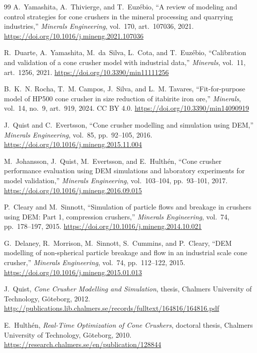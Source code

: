 \begin{thebibliography}{99}
 A.~Yamashita, A.~Thivierge, and T.~Euz\'ebio, ``A review of modeling and control strategies for cone crushers in the
mineral processing and quarrying industries,'' \emph{Minerals Engineering}, vol.~170, art.~107036, 2021.
\url{https://doi.org/10.1016/j.mineng.2021.107036}

 R.~Duarte, A.~Yamashita, M.~da~Silva, L.~Cota, and T.~Euz\'ebio, ``Calibration and validation of a cone crusher
model with industrial data,'' \emph{Minerals}, vol.~11, art.~1256, 2021. \url{https://doi.org/10.3390/min11111256}

 B.~K.~N. Rocha, T.~M. Campos, J.~Silva, and L.~M. Tavares, ``Fit-for-purpose model of HP500 cone crusher in size reduction of
itabirite iron ore,'' \emph{Minerals}, vol.~14, no.~9, art.~919, 2024. CC BY 4.0. \url{https://doi.org/10.3390/min14090919}

 J.~Quist and C.~Evertsson, ``Cone crusher modelling and simulation using DEM,'' \emph{Minerals Engineering}, vol.~85,
pp.~92--105, 2016. \url{https://doi.org/10.1016/j.mineng.2015.11.004}

 M.~Johansson, J.~Quist, M.~Evertsson, and E.~Hulth\'en, ``Cone crusher performance evaluation using DEM simulations and
laboratory experiments for model validation,'' \emph{Minerals Engineering}, vol.~103--104, pp.~93--101, 2017.
\url{https://doi.org/10.1016/j.mineng.2016.09.015}

 P.~Cleary and M.~Sinnott, ``Simulation of particle flows and breakage in crushers using DEM: Part 1, compression crushers,''
\emph{Minerals Engineering}, vol.~74, pp.~178--197, 2015. \url{https://doi.org/10.1016/j.mineng.2014.10.021}

 G.~Delaney, R.~Morrison, M.~Sinnott, S.~Cummins, and P.~Cleary, ``DEM modelling of non-spherical particle breakage and
flow in an industrial scale cone crusher,'' \emph{Minerals Engineering}, vol.~74, pp.~112--122, 2015.
\url{https://doi.org/10.1016/j.mineng.2015.01.013}

 J.~Quist, \emph{Cone Crusher Modelling and Simulation}, thesis, Chalmers University of Technology, G\"oteborg, 2012.
\url{http://publications.lib.chalmers.se/records/fulltext/164816/164816.pdf}

 E.~Hulth\'en, \emph{Real-Time Optimization of Cone Crushers}, doctoral thesis, Chalmers University of Technology, G\"oteborg, 2010.
\url{https://research.chalmers.se/en/publication/128844}


\end{thebibliography}
